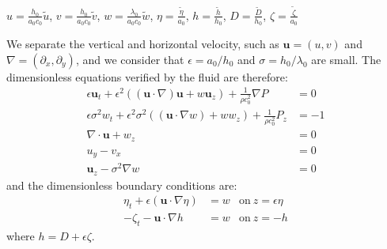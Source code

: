 \documentclass[11pt,a4paper]{article}
\begin{document}
\begin{center}
$ u = \displaystyle \frac{h_0}{a_0 c_0} \tilde{u}$, $ v = \displaystyle \frac{h_0}{a_0 c_0} \tilde{v}$, $ w = \displaystyle \frac{\lambda_0}{a_0 c_0} \tilde{w}$, $\displaystyle \eta = \frac{\tilde{\eta}}{a_0}$, $\displaystyle h = \frac{\tilde{h}}{h_0}$, $\displaystyle D = \frac{\tilde{D}}{h_0}$, $\displaystyle \zeta = \frac{\tilde{\zeta}}{a_0}$
\end{center}
We separate the vertical and horizontal velocity, such as $\mathbf{u} = (u,v)$ and $\nabla = (\partial_x,\partial_y)$, and we consider that $\epsilon = a_0 / h_0$ and $\sigma = h_0 / \lambda_0$ are small. The dimensionless equations verified by the fluid are therefore: 
\begin{align}
\displaystyle \epsilon \mathbf{u}_t + \epsilon^2((\mathbf{u} \cdot \nabla) \mathbf{u} + w \mathbf{u}_z) + \frac{1}{\rho c_0^2} \nabla P & = 0 \label{MConsxy}\\
\displaystyle \epsilon \sigma^2 w_t + \epsilon^2 \sigma^2 ((\mathbf{u} \cdot \nabla w) + w w_z) + \frac{1}{\rho c_0^2} P_z & = -1 \label{MConsz}\\
\nabla \cdot \mathbf{u} + w_z & =  0 \label{MassCons}\\
u_y-v_x & = 0 \label{Irrxy}\\
\mathbf{u}_z - \sigma^2 \nabla w & = 0 \label{Irrz}
\end{align}
and the dimensionless boundary conditions are: 
\begin{align}
\eta_t + \epsilon (\mathbf{u} \cdot \nabla \eta ) & = w & \mathrm{on} \: z = \epsilon \eta \label{BCH}\\
- \zeta_t - \mathbf{u} \cdot \nabla h & = w & \mathrm{on} \:  z = -h \label{BCB}
\end{align}
where $h = D + \epsilon \zeta $.
\end{document}
